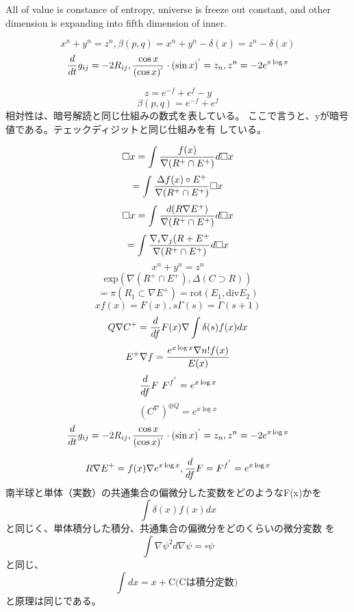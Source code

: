 \documentclass{jsarticle}
\begin{document}
    All of value is constance of entropy, universe is freeze out
    constant, and other dimension is expanding into fifth dimension of
    inner.


      $$ x^n + y^n = z^n, \beta(p,q) = x^n + y^n - \delta(x) = z^n - \delta
      (x) $$
      $$ {d \over dt}g_{ij} = - 2 R_{ij}, {\cos x \over (\cos x)^{'}}
      \cdot (\sin x)^{'} = z_n, z^n = - 2 e^{x \log x} $$

      $$ z = e^{-f} + e^{f} - y $$
      $$ \beta(p,q) = e^{-f} + e^{f} $$
      相対性は、暗号解読と同じ仕組みの数式を表している。
      ここで言うと、yが暗号値である。テェックディジットと同じ仕組みを有
      している。

      $$ \square x = \int {f(x) \over {\nabla(R^{+}\cap E^{+})}}d \square x$$
      $$= \int {{\Delta f(x) \circ E^{+}} \over {\nabla(R^{+}\cap E^{+})}}
      \square x $$
      $$ \square x = \int {d(R \nabla E^{+}) \over {\nabla(R^{+} \cap E^{+})}}
      d \square x $$
      $$ = \int {{\nabla_{i} \nabla_{j} (R + E^{+}} \over {\nabla(R^{+}
      \cap  E^{+})}}d \square x $$
      $$ x^n + y^n = z^n $$
      $$ \mathrm{exp}(\nabla(R^{+}\cap E^{+}),\Delta(C \supset R)) $$
      $$ = \pi (R_1 \subset \nabla E^{+}) = \mathrm{rot}(E_1, 
      \mathrm{div}E_2) $$
      $$ xf(x) = F(x), s\Gamma(s) = \Gamma(s+1) $$
      $$ Q \nabla C^{+} = {d \over df}F(x) \nabla \int \delta(s)f(x)dx $$
      $$ E^{+}\nabla f = {{e^{x \log x} \nabla n! f(x)} \over {E(x)}} $$
      $$ {d \over df}F ~ F^{{f}^{'}} = e^{x \log x} $$
      $$ (C^{\nabla})^{\oplus Q} = e^{x \log x} $$
      $$ {d \over dt}g_{ij} = - 2 R_{ij}, {\cos x \over (\cos x)^{'}}
      \cdot (\sin x)^{'} = z_n, z^n = - 2 e^{x \log x} $$

      $$ R \nabla E^{+} = f(x) \nabla e^{x \log x}, {d \over df}F = F^{
	      {f}^{'}} = e^{x \log x}  $$
      南半球と単体（実数）の共通集合の偏微分した変数をどのようなF(x)かを
      $$ \int \delta(x)f(x)dx $$
      と同じく、単体積分した積分、共通集合の偏微分をどのくらいの微分変数
      を
      $$ \int \nabla \psi^2 d \nabla \psi = \square \psi $$
      と同じ、
      $$ \int dx = x + \text{C(Cは積分定数) }$$
      と原理は同じである。
\end{document}
